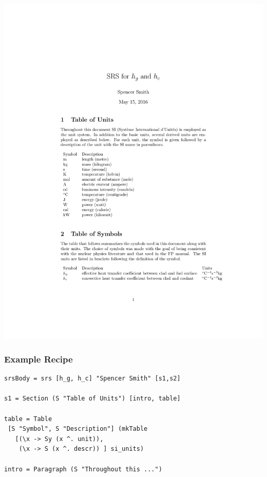 \documentclass{beamer}
\begin{document}
\begin{frame}[fragile]


\begin{center}
\includegraphics[scale=0.8]{SRS_Excerpt.pdf}
\end{center}
\end{frame}

\begin{frame}[fragile]

\frametitle{Example Recipe}

\begin{lstlisting}[frame=none, 
  showstringspaces=false, basicstyle=\small]
srsBody = srs [h_g, h_c] "Spencer Smith" [s1,s2]

s1 = Section (S "Table of Units") [intro, table]

table = Table 
 [S "Symbol", S "Description"] (mkTable
   [(\x -> Sy (x ^. unit)),
    (\x -> S (x ^. descr)) ] si_units)

intro = Paragraph (S "Throughout this ...")
\end{lstlisting}
\end{frame}
\end{document}
